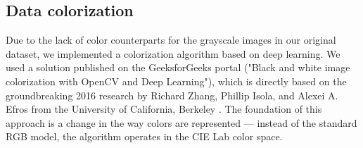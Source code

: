 \documentclass{article}
\begin{document}
\subsection{Data colorization}
\label{sec:colorization}
Due to the lack of color counterparts for the grayscale images in our original dataset, we implemented a colorization algorithm based on deep learning. We used a solution published on the GeeksforGeeks \cite{gfg_colorization} portal ("Black and white image colorization with OpenCV and Deep Learning"), which is directly based on the groundbreaking 2016 research by Richard Zhang, Phillip Isola, and Alexei A. Efros from the University of California, Berkeley \cite{zhang_colorful_2016}. The foundation of this approach is a change in the way colors are represented — instead of the standard RGB model, the algorithm operates in the CIE Lab color space.
\end{document}
